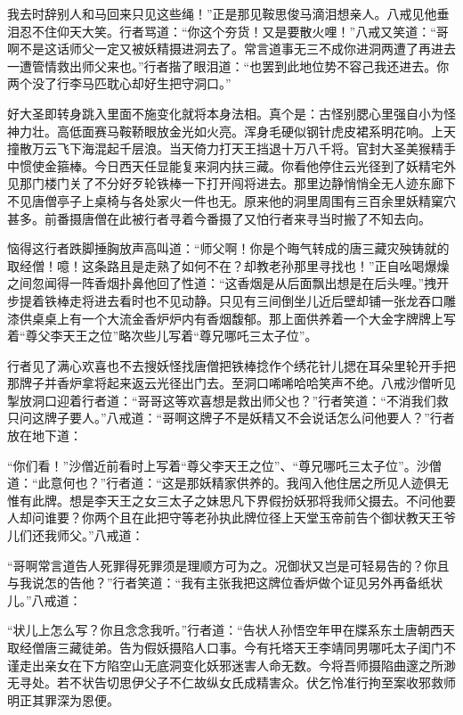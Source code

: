 \documentclass[12pt,UTF8]{ctexbook}
\begin{document}
{	我去时辞别人和马回来只见这些绳！”正是那见鞍思俊马滴泪想亲人。八戒见他垂泪忍不住仰天大笑。行者骂道：“你这个夯货！又是要散火哩！”八戒又笑道：“哥啊不是这话师父一定又被妖精摄进洞去了。常言道事无三不成你进洞两遭了再进去一遭管情救出师父来也。”行者揩了眼泪道：“也罢到此地位势不容己我还进去。你两个没了行李马匹耽心却好生把守洞口。”
	
	好大圣即转身跳入里面不施变化就将本身法相。真个是：古怪别腮心里强自小为怪神力壮。高低面赛马鞍鞒眼放金光如火亮。浑身毛硬似钢针虎皮裙系明花响。上天撞散万云飞下海混起千层浪。当天倚力打天王挡退十万八千将。官封大圣美猴精手中惯使金箍棒。今日西天任显能复来洞内扶三藏。你看他停住云光径到了妖精宅外见那门楼门关了不分好歹轮铁棒一下打开闯将进去。那里边静悄悄全无人迹东廊下不见唐僧亭子上桌椅与各处家火一件也无。原来他的洞里周围有三百余里妖精窠穴甚多。前番摄唐僧在此被行者寻着今番摄了又怕行者来寻当时搬了不知去向。
	
	恼得这行者跌脚捶胸放声高叫道：“师父啊！你是个晦气转成的唐三藏灾殃铸就的取经僧！噫！这条路且是走熟了如何不在？却教老孙那里寻找也！”正自吆喝爆燥之间忽闻得一阵香烟扑鼻他回了性道：“这香烟是从后面飘出想是在后头哩。”拽开步提着铁棒走将进去看时也不见动静。只见有三间倒坐儿近后壁却铺一张龙吞口雕漆供桌桌上有一个大流金香炉炉内有香烟馥郁。那上面供养着一个大金字牌牌上写着“尊父李天王之位”略次些儿写着“尊兄哪吒三太子位”。
	
	行者见了满心欢喜也不去搜妖怪找唐僧把铁棒捻作个绣花针儿揌在耳朵里轮开手把那牌子并香炉拿将起来返云光径出门去。至洞口唏唏哈哈笑声不绝。八戒沙僧听见掣放洞口迎着行者道：“哥哥这等欢喜想是救出师父也？”行者笑道：“不消我们救只问这牌子要人。”八戒道：“哥啊这牌子不是妖精又不会说话怎么问他要人？”行者放在地下道：
	
	“你们看！”沙僧近前看时上写着“尊父李天王之位”、“尊兄哪吒三太子位”。沙僧道：“此意何也？”行者道：“这是那妖精家供养的。我闯入他住居之所见人迹俱无惟有此牌。想是李天王之女三太子之妹思凡下界假扮妖邪将我师父摄去。不问他要人却问谁要？你两个且在此把守等老孙执此牌位径上天堂玉帝前告个御状教天王爷儿们还我师父。”八戒道：
	
	“哥啊常言道告人死罪得死罪须是理顺方可为之。况御状又岂是可轻易告的？你且与我说怎的告他？”行者笑道：“我有主张我把这牌位香炉做个证见另外再备纸状儿。”八戒道：
	
	“状儿上怎么写？你且念念我听。”行者道：“告状人孙悟空年甲在牒系东土唐朝西天取经僧唐三藏徒弟。告为假妖摄陷人口事。今有托塔天王李靖同男哪吒太子闺门不谨走出亲女在下方陷空山无底洞变化妖邪迷害人命无数。今将吾师摄陷曲邃之所渺无寻处。若不状告切思伊父子不仁故纵女氏成精害众。伏乞怜准行拘至案收邪救师明正其罪深为恩便。
	
}
\end{document}
